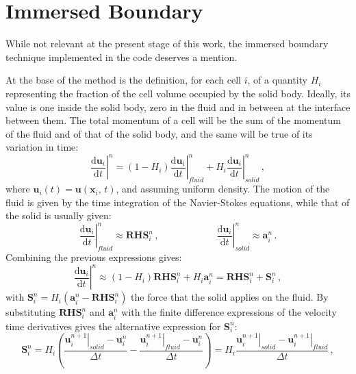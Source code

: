 \documentclass[11pt, a4paper, oneside, openany]{book}
\begin{document}
\section{Immersed Boundary}\label{Chapter_Solver_Section_Immersed_Boundary}
While not relevant at the present stage of this work, the immersed boundary technique implemented in the code deserves a mention.\par
At the base of the method is the definition, for each cell $i$, of a quantity $H_{i}$ representing the fraction of the cell volume occupied by the solid body. Ideally, its value is one inside the solid body, zero in the fluid and in between at the interface between them. 
The total momentum of a cell will be the sum of the momentum of the fluid and of that of the solid body, and the same will be true of its variation in time:
\begin{equation}
\left.\dfrac{\mathrm{d}\boldsymbol{u}_{i}}{\mathrm{d}t}\right|^{n}=\left(1-H_{i}\right)\left.\dfrac{\mathrm{d}\boldsymbol{u}_{i}}{\mathrm{d}t}\right|^{n}_{fluid}+H_{i}\left.\dfrac{\mathrm{d}\boldsymbol{u}_{i}}{\mathrm{d}t}\right|^{n}_{solid}\,,\label{IBM_01}
\end{equation}
where $\boldsymbol{u}_{i}\left(t\right)=\boldsymbol{u}\left(\boldsymbol{x}_{i},\,t\right)$, and assuming uniform density. The motion of the fluid is given by the time integration of the Navier-Stokes equations, while that of the solid is usually given:
\begin{equation*}
\left.\dfrac{\mathrm{d}\boldsymbol{u}_{i}}{\mathrm{d}t}\right|^{n}_{fluid}\approx\boldsymbol{RHS}^{n}_{i}\,,\qquad\qquad\qquad\left.\dfrac{\mathrm{d}\boldsymbol{u}_{i}}{\mathrm{d}t}\right|^{n}_{solid}\approx\boldsymbol{a}^{n}_{i}\,.
\end{equation*}
Combining the previous expressions gives:
\begin{equation}
\left.\dfrac{\mathrm{d}\boldsymbol{u}_{i}}{\mathrm{d}t}\right|^{n}\approx\left(1-H_{i}\right)\boldsymbol{RHS}^{n}_{i}+H_{i}\boldsymbol{a}^{n}_{i}=\boldsymbol{RHS}^{n}_{i}+\boldsymbol{S}^{n}_{i}\,,\label{IBM_02}
\end{equation}
with $\boldsymbol{S}^{n}_{i}=H_{i}\left(\boldsymbol{a}^{n}_{i}-\boldsymbol{RHS}^{n}_{i}\right)$ the force that the solid applies on the fluid. By substituting $\boldsymbol{RHS}^{n}_{i}$ and $\boldsymbol{a}^{n}_{i}$ with the finite difference expressions of the velocity time derivatives gives the alternative expression for $\boldsymbol{S}^{n}_{i}$:
\begin{equation}
\boldsymbol{S}^{n}_{i}=H_{i}\left(\dfrac{\left.\boldsymbol{u}_{i}^{n+1}\right|_{solid}-\boldsymbol{u}_{i}^{n}}{\Delta t}-\dfrac{\left.\boldsymbol{u}_{i}^{n+1}\right|_{fluid}-\boldsymbol{u}_{i}^{n}}{\Delta t}\right)=H_{i}\dfrac{\left.\boldsymbol{u}_{i}^{n+1}\right|_{solid}-\left.\boldsymbol{u}_{i}^{n+1}\right|_{fluid}}{\Delta t}\,,
\end{equation}
\end{document}
